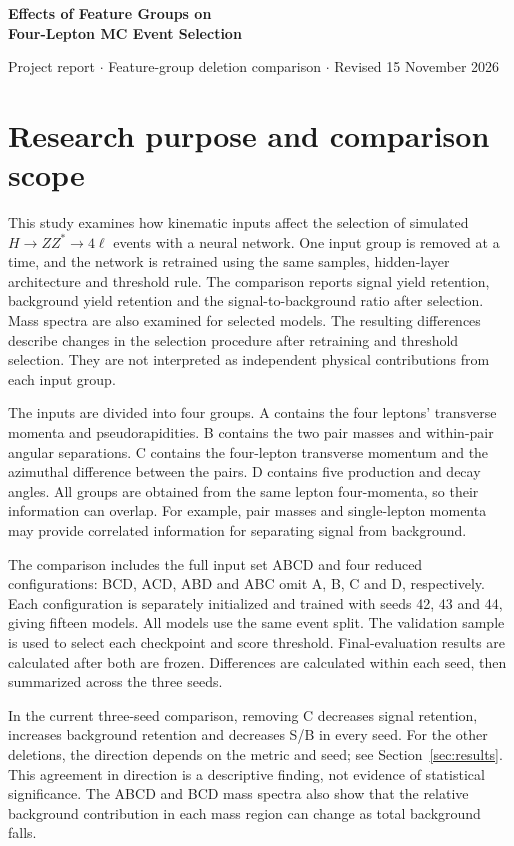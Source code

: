 \documentclass[11pt,a4paper]{article}
\begin{document}
{\LARGE\bfseries\color{reportblue} Effects of Feature Groups on\\ Four-Lepton MC Event Selection\par}
\vspace{6pt}
Project report $\cdot$ Feature-group deletion comparison $\cdot$ Revised 15 November 2026

\section{Research purpose and comparison scope}

This study examines how kinematic inputs affect the selection of simulated $H\to ZZ^*\to4\ell$ events with a neural network.
One input group is removed at a time, and the network is retrained using the same samples, hidden-layer architecture and threshold rule.
The comparison reports signal yield retention, background yield retention and the signal-to-background ratio after selection. Mass spectra are also examined for selected models.
The resulting differences describe changes in the selection procedure after retraining and threshold selection. They are not interpreted as independent physical contributions from each input group.

The inputs are divided into four groups. A contains the four leptons' transverse momenta and pseudorapidities. B contains the two pair masses and within-pair angular separations. C contains the four-lepton transverse momentum and the azimuthal difference between the pairs. D contains five production and decay angles.
All groups are obtained from the same lepton four-momenta, so their information can overlap.
For example, pair masses and single-lepton momenta may provide correlated information for separating signal from background.

The comparison includes the full input set ABCD and four reduced configurations: BCD, ACD, ABD and ABC omit A, B, C and D, respectively.
Each configuration is separately initialized and trained with seeds 42, 43 and 44, giving fifteen models.
All models use the same event split. The validation sample is used to select each checkpoint and score threshold. Final-evaluation results are calculated after both are frozen.
Differences are calculated within each seed, then summarized across the three seeds.

In the current three-seed comparison, removing C decreases signal retention, increases background retention and decreases S/B in every seed.
For the other deletions, the direction depends on the metric and seed; see Section~\ref{sec:results}.
This agreement in direction is a descriptive finding, not evidence of statistical significance.
The ABCD and BCD mass spectra also show that the relative background contribution in each mass region can change as total background falls.
\end{document}
